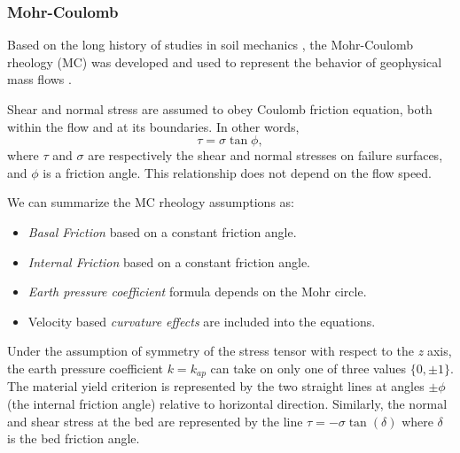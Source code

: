 \documentclass{article}
\begin{document}
\subsubsection{Mohr-Coulomb}\label{MCM}
Based on the long history of studies in soil mechanics \citep{Rankine1857,Jaeger1989}, the Mohr-Coulomb rheology (MC) was developed and used to represent the behavior of geophysical mass flows \cite{SavageHutter1989}.

Shear and normal stress are assumed to obey Coulomb friction equation, both within the flow and at its boundaries. In other words,
\begin{equation}
\tau = \sigma \tan \phi,
\end{equation}
where $\tau$ and $\sigma$ are respectively the shear and normal stresses on failure surfaces, and $\phi$ is a friction angle. This relationship does not depend on the flow speed.

We can summarize the MC rheology assumptions as:
\begin{itemize}
\item \textit{Basal Friction} based on a constant friction angle.

\item \textit{Internal Friction} based on a constant friction angle.

\item \textit{Earth pressure coefficient} formula depends on the Mohr circle.

\item Velocity based \textit{curvature effects} are included into the equations.
\end{itemize}

Under the assumption of symmetry of the stress tensor with respect to the \textit{z} axis, the earth pressure coefficient $k=k_{ap}$ can take on only one of three values $\{ 0, \pm 1\}$. The material yield criterion is represented by the two straight lines at angles $\pm \phi$ (the internal friction angle) relative to horizontal direction. Similarly, the normal and shear stress at the bed are represented by the line $\tau=-\sigma \tan(\delta)$ where $\delta$ is the bed friction angle.
\end{document}
